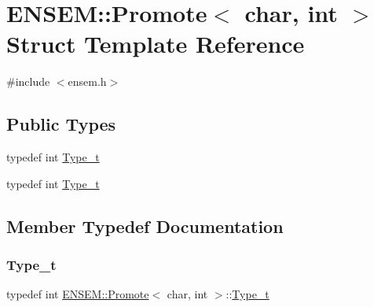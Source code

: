 \hypertarget{structENSEM_1_1Promote_3_01char_00_01int_01_4}{}\section{E\+N\+S\+EM\+:\+:Promote$<$ char, int $>$ Struct Template Reference}
\label{structENSEM_1_1Promote_3_01char_00_01int_01_4}


{\ttfamily \#include $<$ensem.\+h$>$}

\subsection*{Public Types}
\begin{DoxyCompactItemize}
\item 
typedef int \mbox{\hyperlink{structENSEM_1_1Promote_3_01char_00_01int_01_4_a94b5bc0192c5f4da6285165db6fa7ace}{Type\+\_\+t}}
\item 
typedef int \mbox{\hyperlink{structENSEM_1_1Promote_3_01char_00_01int_01_4_a94b5bc0192c5f4da6285165db6fa7ace}{Type\+\_\+t}}
\end{DoxyCompactItemize}


\subsection{Member Typedef Documentation}
\mbox{\label{structENSEM_1_1Promote_3_01char_00_01int_01_4_a94b5bc0192c5f4da6285165db6fa7ace}} 
\subsubsection{\texorpdfstring{Type\_t}{Type\_t}\hspace{0.1cm}{\footnotesize\ttfamily [1/2]}}
{\footnotesize\ttfamily typedef int \mbox{\hyperlink{structENSEM_1_1Promote}{E\+N\+S\+E\+M\+::\+Promote}}$<$ char, int $>$\+::\mbox{\hyperlink{structENSEM_1_1Promote_3_01char_00_01int_01_4_a94b5bc0192c5f4da6285165db6fa7ace}{Type\+\_\+t}}}

\mbox{\label{structENSEM_1_1Promote_3_01char_00_01int_01_4_a94b5bc0192c5f4da6285165db6fa7ace}} 
